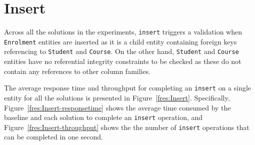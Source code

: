 \section{Insert} \label{s:results-insert}
Across all the solutions in the experiments,   \texttt{insert}  triggers a
validation when \texttt{Enrolment} entities are inserted as it is a child entity
containing foreign keys referencing to \texttt{Student} and \texttt{Course}.
On the other hand,  \texttt{Student} and \texttt{Course} entities have no
referential integrity constraints to be checked as these do not contain any
references to other column families.

The average response time and throughput for completing an \texttt{insert} on a
single entity for all the solutions is presented in Figure~\ref{fres:Insert}.
Specifically, Figure~\ref{fres:Insert-responsetime} shows the average time
consumed by the baseline and each solution to complete an \texttt{insert}
operation,  and Figure~\ref{fres:Insert-throughput} shows the  the number of
\texttt{insert} operations that can be completed in one second.

